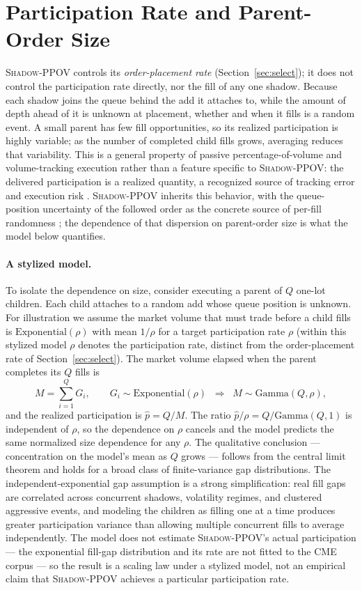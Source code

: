 \documentclass[11pt]{article}
\newcommand{\pov}{\textsc{Shadow-PPOV}}
\begin{document}
\section{Participation Rate and Parent-Order Size}
\label{sec:partsize}

\pov{} controls its \emph{order-placement rate} (Section~\ref{sec:select}); it
does not control the participation rate directly, nor the fill of any
one shadow. Because each shadow joins the queue behind the add it
attaches to, while the amount of depth ahead of it is unknown at placement,
whether and when it fills is a random event. A small parent has few fill
opportunities, so its realized participation is highly variable; as the number of
completed child fills grows, averaging reduces that variability. This is a general
property of passive percentage-of-volume and volume-tracking
execution rather than a feature specific to \pov{}: the delivered participation
is a realized quantity, a recognized source of
tracking error and execution risk
\cite{kissell,cjp2015,bialkowski2008,freiwestray2015}. \pov{} inherits this
behavior, with the queue-position uncertainty of the followed order as the
concrete source of per-fill randomness \cite{moallemi2016,negdrift2024}; the
dependence of that dispersion on parent-order size is what the model below
quantifies.

\paragraph{A stylized model.} To isolate the dependence on size, consider
executing a parent of $Q$ one-lot children. Each child attaches to a random add
whose queue position is unknown. For illustration we assume the market volume
that must trade before a child fills is $\mathrm{Exponential}(\rho)$ with mean
$1/\rho$ for a target participation rate $\rho$ (within this stylized model
$\rho$ denotes the participation rate, distinct from the order-placement rate of
Section~\ref{sec:select}). The market volume elapsed when
the parent completes its $Q$ fills is
\[
  M = \sum_{i=1}^{Q} G_i, \qquad G_i \sim \mathrm{Exponential}(\rho)
  \;\;\Longrightarrow\;\; M \sim \mathrm{Gamma}(Q, \rho),
\]
and the realized participation is $\hat{p} = Q/M$. The ratio
$\hat{p}/\rho = Q/\mathrm{Gamma}(Q,1)$ is independent of $\rho$, so the dependence
on $\rho$ cancels and the model predicts the same normalized size dependence for
any $\rho$. The qualitative conclusion --- concentration on the model's mean as
$Q$ grows --- follows from the central limit theorem and holds for a broad class
of finite-variance gap distributions. The independent-exponential gap assumption
is a strong simplification: real fill gaps are correlated across concurrent
shadows, volatility regimes, and clustered aggressive events, and modeling the
children as filling one at a time produces greater participation variance than
allowing multiple concurrent fills to average independently. The model does not
estimate \pov{}'s actual participation --- the exponential fill-gap distribution
and its rate are not fitted to the CME corpus --- so the result is a scaling law
under a stylized model, not an empirical claim that \pov{} achieves a particular
participation rate.
\end{document}
